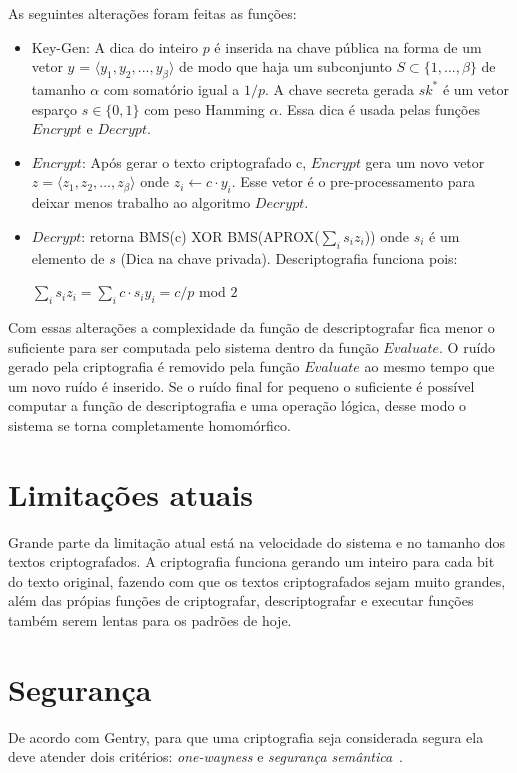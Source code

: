 As seguintes alterações foram feitas as funções:
\begin{itemize}
	\item Key-Gen: A dica do inteiro $p$ é inserida na chave pública na forma de um vetor $y$ = $ \langle y_1, y_2, ..., y_{\beta} \rangle $ de modo que haja um subconjunto  $ S \subset \lbrace 1,...,\beta \rbrace $ de tamanho $ \alpha $ com somatório igual a $1/p$. A chave secreta gerada $sk^{*}$ é um vetor esparço $s \in \lbrace 0,1 \rbrace $ com peso Hamming $ \alpha $. Essa dica é usada pelas funções $Encrypt$ e $Decrypt$.
  	\item $Encrypt$: Após gerar o texto criptografado c, $Encrypt$ gera um novo vetor $z = \langle z_1, z_2, ..., z_{\beta} \rangle $ onde $ z_i \leftarrow c \cdot y_i $. Esse vetor é o pre-processamento para deixar menos trabalho ao algoritmo $Decrypt$.
  	\item $Decrypt$: retorna BMS(c) XOR BMS(APROX($ \sum_{i}^{} s_i z_i $)) onde $s_i$ é um elemento de $s$ (Dica na chave privada). Descriptografia funciona pois: \begin{center} $\sum_{i}^{} s_i z_i = \sum_{i}^{} c \cdot s_i y_i = c/p$ mod $2$ \end{center}	
\end{itemize}

Com essas alterações a complexidade da função de descriptografar fica menor o suficiente para ser computada pelo sistema dentro da função $Evaluate$. O ruído gerado pela criptografia é removido pela função $Evaluate$ ao mesmo tempo que um novo ruído é inserido. Se o ruído final for pequeno o suficiente é possível computar a função de descriptografia e uma operação lógica, desse modo o sistema se torna completamente homomórfico.
	
\section{Limitações atuais}
Grande parte da limitação atual está na velocidade do sistema e no tamanho dos textos criptografados. A criptografia funciona gerando um inteiro para cada bit do texto original, fazendo com que os textos criptografados sejam muito grandes, além das própias funções de criptografar, descriptografar e executar funções também serem lentas para os padrões de hoje.

\section{Segurança}
De acordo com Gentry, para que uma criptografia seja considerada segura ela deve atender dois critérios: \textit{one-wayness} e \textit{segurança semântica}~\cite{probability}.

